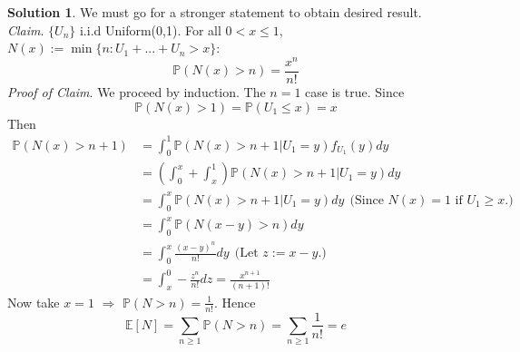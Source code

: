 \documentclass[a4paper, 10pt]{article}
\theoremstyle{definition}
\theoremstyle{hSol}
\newtheorem*{solution}{Solution}
\begin{document}
\begin{solution} We must go for a stronger statement to obtain desired result. \\
\textit{Claim}. $\{U_n\}$ i.i.d Uniform(0,1). For all $0<x\leq1$, $N(x):=\min\{n: U_1+...+U_n>x\}$:
$$\mathbb{P}\left(N(x)>n\right)=\frac{x^n}{n!}$$
\textit{Proof of Claim}. We proceed by induction. The $n=1$ case is true. Since
\begin{equation}
  \mathbb{P}\left(N(x)>1\right) = \mathbb{P}\left(U_1 \leq x\right) = x
\end{equation}
Then
\begin{equation}
  \begin{split}
    \mathbb{P}\left(N(x)>n+1\right) &= \int_0^1 \mathbb{P}\left(N(x)>n+1|U_1=y\right) f_{U_1}(y) dy \\
    &= \left(\int_0^x + \int_x^1\right) \mathbb{P}\left(N(x)>n+1|U_1=y\right) dy\\
    &= \int_0^x\mathbb{P}\left(N(x)>n+1|U_1=y\right) dy~~\text{(Since $N(x)=1$ if $U_1\geq x$.)}\\
    &= \int_0^x\mathbb{P}\left(N(x-y)>n\right) dy \\
    &= \int_0^x \frac{(x-y)^n}{n!} dy ~~\text{(Let $z:=x-y$.)}\\
    &= \int_x^0 -\frac{z^n}{n!}dz = \frac{x^{n+1}}{(n+1)!}
  \end{split}
\end{equation}
Now take $x=1$ $\Rightarrow$ $\mathbb{P}\left(N>n\right)=\frac{1}{n!}$. Hence
\begin{equation}
  \mathbb{E}\left[N\right] = \sum_{n\geq 1}\mathbb{P}\left(N>n\right) = \sum_{n\geq 1}\frac{1}{n!} = e
\end{equation}
\end{solution}
\end{document}
